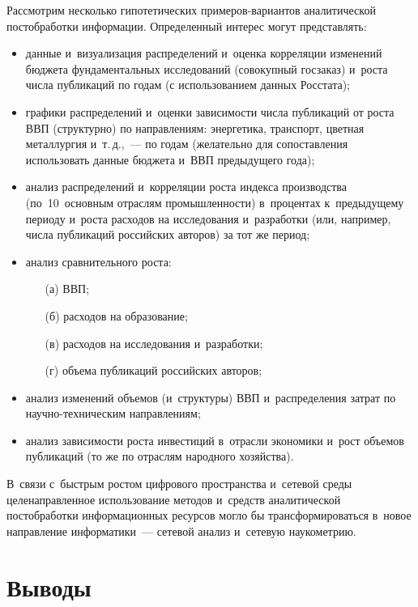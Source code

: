 \begin{multicols}{2}
    Рассмотрим несколько гипотетических при\-ме\-ров-ва\-ри\-ан\-тов аналитической 
постобработки информации. Определенный интерес могут пред\-став\-лять:
    \begin{itemize}
    \item данные и~визуализация распределений и~оценка корреляции 
изменений бюджета фундаментальных исследований (совокупный госзаказ) 
и~роста числа пуб\-ли\-ка\-ций по годам (с использованием данных Росстата); 
    \item  графики распределений и~оценки зависимости числа публикаций от 
роста ВВП (структурно) по на\-прав\-ле\-ни\-ям: энергетика, транспорт, цветная 
металлургия и~т.\,д.,~--- по годам (желательно для сопоставления использовать 
данные бюджета и~ВВП предыдущего года);
    \item  анализ распределений и~корреляции роста индекса производства 
(по~10~основным отраслям про\-мыш\-лен\-ности) в~процентах к~предыдущему 
периоду и~роста расходов на исследования и~разработки (или, например, числа 
пуб\-ли\-ка\-ций российских авторов) за тот же период;
    \item анализ сравнительного роста: 
    \begin{itemize}
    \item[(а)] ВВП; 
    \item[(б)] расходов на образование;
        \item[(в)] расходов на исследования и~разработки; 
    \item[(г)] объема пуб\-ли\-ка\-ций российских авторов;
    \end{itemize}
    \item  анализ изменений объемов (и~структуры) ВВП и~распределения 
затрат по на\-уч\-но-тех\-ни\-че\-ским на\-прав\-ле\-ниям;
    \item  анализ зависимости роста инвестиций в~от\-расли экономики и~рост 
объемов публикаций (то же по отраслям народного хозяйства).
    \end{itemize}
    
    В~связи с~быстрым ростом цифрового пространства и~сетевой среды 
целенаправленное ис\-поль\-зование методов и~средств аналитической 
пост\-обработки информационных ресурсов могло бы трансформи\-ро\-вать\-ся 
в~новое направление информатики~--- сетевой анализ и~сетевую наукометрию. 
    
    \section{Выводы}
    

\end{multicols}
